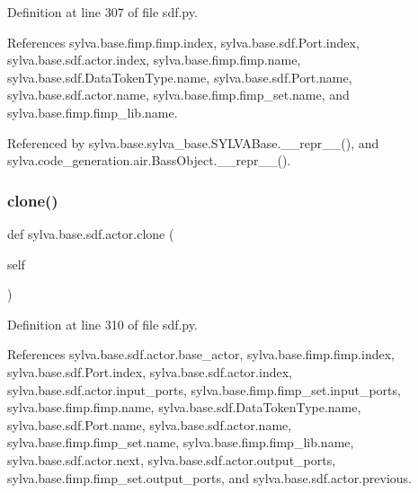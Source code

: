 Definition at line 307 of file sdf.\+py.



References sylva.\+base.\+fimp.\+fimp.\+index, sylva.\+base.\+sdf.\+Port.\+index, sylva.\+base.\+sdf.\+actor.\+index, sylva.\+base.\+fimp.\+fimp.\+name, sylva.\+base.\+sdf.\+Data\+Token\+Type.\+name, sylva.\+base.\+sdf.\+Port.\+name, sylva.\+base.\+sdf.\+actor.\+name, sylva.\+base.\+fimp.\+fimp\+\_\+set.\+name, and sylva.\+base.\+fimp.\+fimp\+\_\+lib.\+name.



Referenced by sylva.\+base.\+sylva\+\_\+base.\+S\+Y\+L\+V\+A\+Base.\+\_\+\+\_\+repr\+\_\+\+\_\+(), and sylva.\+code\+\_\+generation.\+air.\+Bass\+Object.\+\_\+\+\_\+repr\+\_\+\+\_\+().


\mbox{\label{classsylva_1_1base_1_1sdf_1_1actor_a366534a2c6988eb885d89b7259c5b411}} 
\subsubsection{\texorpdfstring{clone()}{clone()}}
{\footnotesize\ttfamily def sylva.\+base.\+sdf.\+actor.\+clone (\begin{DoxyParamCaption}\item[{}]{self }\end{DoxyParamCaption})}



Definition at line 310 of file sdf.\+py.



References sylva.\+base.\+sdf.\+actor.\+base\+\_\+actor, sylva.\+base.\+fimp.\+fimp.\+index, sylva.\+base.\+sdf.\+Port.\+index, sylva.\+base.\+sdf.\+actor.\+index, sylva.\+base.\+sdf.\+actor.\+input\+\_\+ports, sylva.\+base.\+fimp.\+fimp\+\_\+set.\+input\+\_\+ports, sylva.\+base.\+fimp.\+fimp.\+name, sylva.\+base.\+sdf.\+Data\+Token\+Type.\+name, sylva.\+base.\+sdf.\+Port.\+name, sylva.\+base.\+sdf.\+actor.\+name, sylva.\+base.\+fimp.\+fimp\+\_\+set.\+name, sylva.\+base.\+fimp.\+fimp\+\_\+lib.\+name, sylva.\+base.\+sdf.\+actor.\+next, sylva.\+base.\+sdf.\+actor.\+output\+\_\+ports, sylva.\+base.\+fimp.\+fimp\+\_\+set.\+output\+\_\+ports, and sylva.\+base.\+sdf.\+actor.\+previous.


